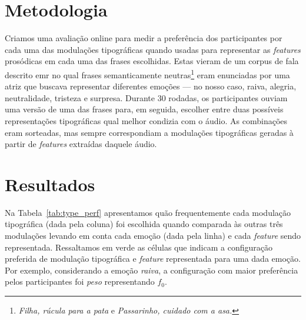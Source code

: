 \documentclass[11pt]{article}
\begin{document}
  \section{Metodologia}
  \label{sec:metodologia}
 
 Criamos uma avaliação online para medir a preferência dos participantes por cada uma das modulações tipográficas quando usadas para representar as {\itshape features} prosódicas em cada uma das frases escolhidas. Estas vieram de um corpus de fala descrito emr \cite{pdpcosta2015} no qual frases semanticamente neutras\footnote{{\itshape Filha, rúcula para a pata} e {\itshape Passarinho, cuidado com a asa.}} eram enunciadas por uma atriz que buscava representar diferentes emoções --- no nosso caso, raiva, alegria, neutralidade, tristeza e surpresa. Durante 30 rodadas, os participantes ouviam uma versão de uma das frases para, em seguida, escolher entre duas possíveis representações tipográficas qual melhor condizia com o áudio. As combinações eram sorteadas, mas sempre correspondiam a modulações tipográficas geradas à partir de {\itshape features} extraídas daquele áudio.
  


\section{Resultados}
  \label{sec:resultados}
  
  Na Tabela~\ref{tab:type_perf} apresentamos quão frequentemente cada modulação tipográfica (dada pela coluna) foi escolhida quando comparada às outras três modulações levando em conta cada emoção (dada pela linha) e cada {\itshape feature} sendo representada. Ressaltamos em verde as células que indicam a configuração preferida de modulação tipográfica e {\itshape feature} representada para uma dada emoção. Por exemplo, considerando a emoção {\itshape raiva}, a configuração com maior preferência pelos participantes foi {\itshape peso} representando $f_0$.
  
\end{document}
